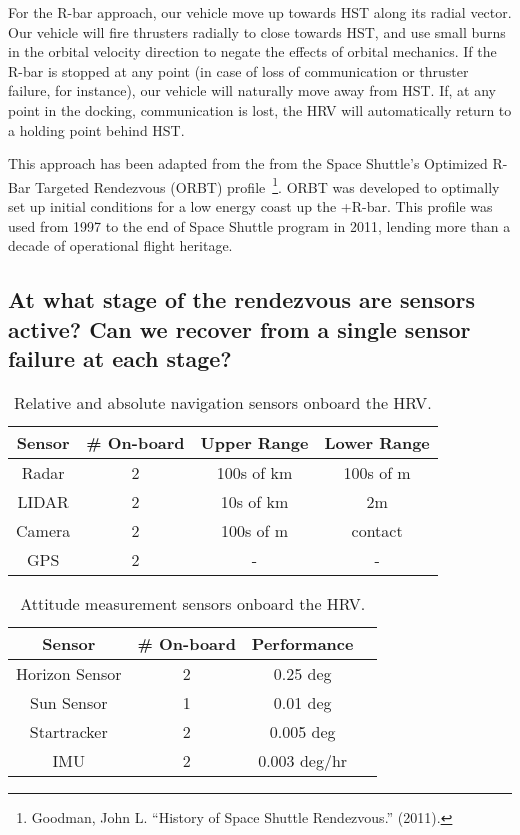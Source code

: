 \documentclass[onecolumn,10pt]{jhwhw}
\begin{document}
For the R-bar approach, our vehicle move up towards HST along its radial vector. Our vehicle will fire thrusters radially to close towards HST, and use small burns in the orbital velocity direction to negate the effects of orbital mechanics. If the R-bar is stopped at any point (in case of loss of communication or thruster failure, for instance), our vehicle will naturally move away from HST. If, at any point in the docking, communication is lost, the HRV will automatically return to a holding point behind HST.

This approach has been adapted from the from the Space Shuttle's Optimized R-Bar Targeted Rendezvous (ORBT) profile~\footnote{Goodman, John L. ``History of Space Shuttle Rendezvous.'' (2011).}. ORBT was developed to optimally set up initial conditions for a low energy coast up the +R-bar. This profile was used from 1997 to the end of Space Shuttle program in 2011, lending more than a decade of operational flight heritage.

\subsection{At what stage of the rendezvous are sensors active? Can we recover from a single sensor failure at each stage?}
\begin{table}[tb]
\begin{center}
\begin{tabular}{c c c c}
\toprule
Sensor & \# On-board & Upper Range & Lower Range \\
\midrule
Radar        & 2 & 100s of km & 100s of m  \\
LIDAR        & 2 & 10s of km & 2m  \\
Camera       & 2 & 100s of m & contact  \\
GPS          & 2 & - & -  \\
\bottomrule
\end{tabular}
\end{center}
\caption{Relative and absolute navigation sensors onboard the HRV.}
\end{table}

\begin{table}[tb]
\begin{center}
\begin{tabular}{c c c c}
\toprule
Sensor & \# On-board & Performance \\
\midrule
Horizon Sensor & 2 & 0.25 deg \\
Sun Sensor     & 1 & 0.01 deg \\
Startracker    & 2 & 0.005 deg \\
IMU            & 2 & 0.003 deg/hr \\
\bottomrule
\end{tabular}
\end{center}
\caption{Attitude measurement sensors onboard the HRV.}
\end{table}
\end{document}
